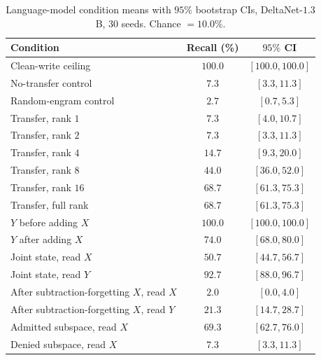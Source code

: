\documentclass[11pt]{article}
\theoremstyle{definition}
\begin{document}
\begin{table}[h]
\centering
\caption{Language-model condition means with $95\%$ bootstrap CIs, DeltaNet-$1.3$B, $30$ seeds. Chance $=10.0\%$.}
\label{tab:lm-means}
\begin{tabular}{lcc}
\toprule
Condition & Recall (\%) & $95\%$ CI \\
\midrule
Clean-write ceiling & $100.0$ & $[100.0,100.0]$ \\
No-transfer control & $7.3$ & $[3.3,11.3]$ \\
Random-engram control & $2.7$ & $[0.7,5.3]$ \\
\midrule
Transfer, rank $1$ & $7.3$ & $[4.0,10.7]$ \\
Transfer, rank $2$ & $7.3$ & $[3.3,11.3]$ \\
Transfer, rank $4$ & $14.7$ & $[9.3,20.0]$ \\
Transfer, rank $8$ & $44.0$ & $[36.0,52.0]$ \\
Transfer, rank $16$ & $68.7$ & $[61.3,75.3]$ \\
Transfer, full rank & $68.7$ & $[61.3,75.3]$ \\
\midrule
$Y$ before adding $X$ & $100.0$ & $[100.0,100.0]$ \\
$Y$ after adding $X$ & $74.0$ & $[68.0,80.0]$ \\
Joint state, read $X$ & $50.7$ & $[44.7,56.7]$ \\
Joint state, read $Y$ & $92.7$ & $[88.0,96.7]$ \\
After subtraction-forgetting $X$, read $X$ & $2.0$ & $[0.0,4.0]$ \\
After subtraction-forgetting $X$, read $Y$ & $21.3$ & $[14.7,28.7]$ \\
\midrule
Admitted subspace, read $X$ & $69.3$ & $[62.7,76.0]$ \\
Denied subspace, read $X$ & $7.3$ & $[3.3,11.3]$ \\
\bottomrule
\end{tabular}
\end{table}
\end{document}
